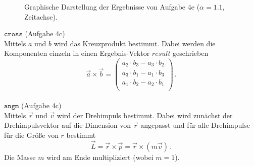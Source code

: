 \begin{landscape}
	\begin{figure}
		\OverfullCenter{\texttt{[image: ../A4/alpha=1.1\_zeitachse.pdf]}}
		\caption{Graphische Darstellung der Ergebnisse von Aufgabe 4e ($\alpha = 1.1$, Zeitachse).}
		\label{fig:4e1.1Zeit}
	\end{figure}
\end{landscape} 	
 			
	$\texttt{cross}$ (Aufgabe 4c)\\
Mittels $a$ und $b$ wird das Kreuzprodukt bestimmt. Dabei werden die Komponenten einzeln in einen Ergebnis-Vektor $\textit{result}$ geschrieben
	\begin{equation*}
		\vec{a} \times \vec{b} =
		\begin{pmatrix}
			a_2 \cdot b_3 - a_3 \cdot b_2 \\
			a_3 \cdot b_1 - a_1 \cdot b_3 \\
			a_1 \cdot b_2 - a_2 \cdot b_1 \\
		\end{pmatrix} \,.
	\end{equation*}
	\\ 		
	
	$\texttt{angm}$ (Aufgabe 4c)\\
Mittels $\vec{r}$ und $\vec{v}$ wird der Drehimpuls bestimmt. Dabei wird zunächst der Drehimpulsvektor auf die Dimension von $\vec{r}$ angepasst und für alle Drehimpulse für die Größe von $r$ bestimmt
	\begin{equation*}
		\vec{L} = \vec{r} \times \vec{p} = \vec{r} \times (m\vec{v}) \,.
	\end{equation*}	
Die Masse $m$ wird am Ende multipliziert (wobei $m = 1$).
	 \\
	 

